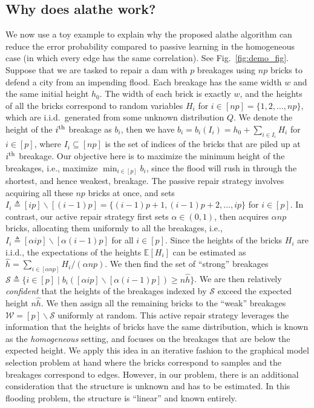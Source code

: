 \documentclass[11pt,onecolumn]{article}
\newcommand{\calS}{\mathcal{S}}
\newcommand{\calW}{\mathcal{W}}
\newcommand{\bbE}{\mathbb{E}}
\newcommand{\hath}{\hat{h}}
\begin{document}
\subsection{Why does \ac{alathe} work?} \label{sec:work}
We now use a toy example to explain why the proposed \ac{alathe} algorithm can reduce the error probability compared to  passive learning in the homogeneous case (in which every edge has the same correlation). See Fig.~\ref{fig:demo_fig}. Suppose that we are tasked   to repair a dam with $p$ breakages using $np$ bricks to defend a city from an impending flood. Each breakage has the same width $w$ and the same initial height $h_{0}$. The width of each 
brick is exactly $w$, and the heights of all the bricks correspond to random variables $H_{i}$ for $i\in[np]=\{1,2,\ldots, np\}$, which are i.i.d.\ generated from some unknown distribution $Q$. We denote the height of the $i^{\rm th}$ breakage as $b_{i}$, then we have 
$b_{i}=b_{i}(I_{i})=h_{0}+\sum_{i\in I_{i}} H_{i}$ for $i\in[p]$, where $I_{i}\subseteq [np]$ is the set of indices of the bricks that are piled up at $i^{\rm th}$ breakage. Our objective here is to maximize the minimum height of the  breakages,  i.e., 
maximize $\min_{i\in[p]} b_{i}$, since the flood will rush in through the shortest, and hence weakest, breakage. The passive repair strategy involves acquiring all these $np$ bricks at once, and sets $I_{i} \triangleq [ip]\backslash[(i-1)p]=\{(i-1)p+1,(i-1)p+2,\ldots,ip\}$ for $i\in[p]$. 
In contrast, our active repair strategy first sets $\alpha \in (0,1)$, then acquires $\alpha np$ bricks, allocating them uniformly to all the breakages, i.e., $I_{i}\triangleq  [\alpha ip]\backslash[\alpha(i-1)p]$ for all $i\in [p]$. Since the heights of the bricks $H_i$ are i.i.d., the expectations of the heights $\bbE[H_i]$ 
can be estimated as $\hath=\sum_{i\in[\alpha np]} H_{i}/(\alpha np)$. We then find the set of ``strong'' breakages $\calS \triangleq \{i\in[p] \mid  b_{i}([\alpha ip]\backslash[\alpha(i-1)p])\geq n\hath\}$. We are then relatively \emph{confident} that 
the heights of the breakages indexed by $\calS$ exceed the expected height $n\hath$. We then assign all the remaining bricks to the ``weak'' breakages $\calW=[p]\backslash\calS$ uniformly at random. This active repair strategy leverages the information that the heights of  bricks have the same distribution, which is known as the \emph{homogeneous} setting, and focuses on the breakages that are below the expected height. We apply this idea in an iterative fashion to the graphical model selection problem at hand where the bricks correspond to samples and the breakages correspond to edges. However, in our problem, there is an additional consideration that the structure is unknown and has to be estimated. In this flooding problem, the structure is ``linear'' and known entirely.
\end{document}
